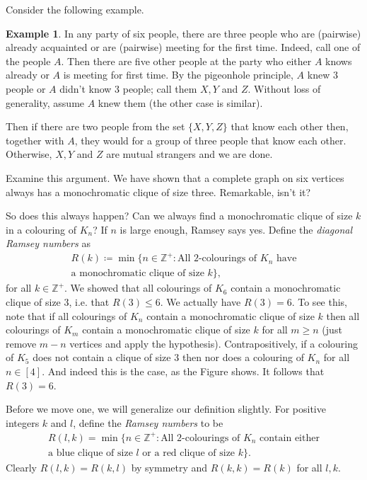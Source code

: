 \documentclass{report}
\theoremstyle{definition}
\theoremstyle{plain}
\theoremstyle{definition}
\newtheorem{eg}[thm]{Example}
\begin{document}
	Consider the following example.
	\begin{eg}
		In any party of six people, there are three people who are (pairwise) already acquainted or are (pairwise) meeting for the first time. Indeed, call one of the people $A$. Then there are five other people at the party who either $A$ knows already or $A$ is meeting for first time. By the pigeonhole principle, $A$ knew 3 people or $A$ didn't know 3 people; call them $X,Y$ and $Z$. Without loss of generality, assume $A$ knew them (the other case is similar).
		
		Then if there are two people from the set $\{X,Y,Z\}$ that know each other then, together with $A$, they would for a group of three people that know each other. Otherwise, $X,Y$ and $Z$ are mutual strangers and we are done.
		
		Examine this argument. We have shown that a complete graph on six vertices always has a monochromatic clique of size three. Remarkable, isn't it?
	\end{eg}
	So does this always happen? Can we always find a monochromatic clique of size $k$ in a colouring of $K_n$? If $n$ is large enough, Ramsey says yes. Define the \emph{diagonal Ramsey numbers} as 
	\begin{multline*}
		R(k) \coloneqq \min\{n\in\mathbb{Z}^+\colon \text{All 2-colourings of $K_n$ have}\\ \text{a monochromatic clique of size $k$}\},
	\end{multline*}
	for all $k\in \mathbb{Z}^+$. We showed that all colourings of $K_6$ contain a monochromatic clique of size 3, i.e. that $R(3) \leq 6$. We actually have $R(3) = 6$. To see this, note that if all colourings of $K_n$ contain a monochromatic clique of size $k$ then all colourings of $K_m$ contain a monochromatic clique of size $k$ for all $m\geq n$ (just remove $m-n$ vertices and apply the hypothesis). Contrapositively, if a colouring of $K_5$ does not contain a clique of size $3$ then nor does a colouring of $K_n$ for all $n\in [4]$. And indeed this is the case, as the {\color{red}{following}} Figure shows. It follows that $R(3)=6$. 
	\begin{center}
		\color{red}{Figure: $K_5$ coloured with no monochromatic clique of size 3}
	\end{center}
	Before we move one, we will generalize our definition slightly. For positive integers $k$ and $l$, define the \emph{Ramsey numbers} to be
	\begin{multline*}
		R(l,k) = \min\{n\in\mathbb{Z}^+\colon \text{All 2-colourings of $K_n$ contain either}\\ \text {a blue clique of size $l$ or a red clique of size $k$}\}.
	\end{multline*}
	Clearly $R(l,k) = R(k,l)$ by symmetry and $R(k,k) = R(k)$ for all $l,k$. 
\end{document}
